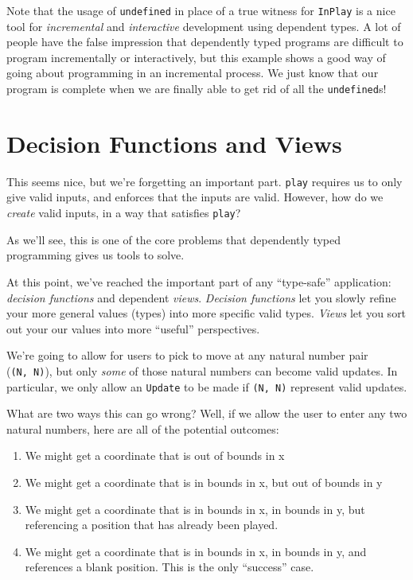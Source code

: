 \documentclass[]{article}
\begin{document}
Note that the usage of \texttt{undefined} in place of a true witness for
\texttt{InPlay} is a nice tool for \emph{incremental} and \emph{interactive}
development using dependent types. A lot of people have the false impression
that dependently typed programs are difficult to program incrementally or
interactively, but this example shows a good way of going about programming in
an incremental process. We just know that our program is complete when we are
finally able to get rid of all the \texttt{undefined}s!

\section{Decision Functions and Views}\label{decision-functions-and-views}

This seems nice, but we're forgetting an important part. \texttt{play} requires
us to only give valid inputs, and enforces that the inputs are valid. However,
how do we \emph{create} valid inputs, in a way that satisfies \texttt{play}?

As we'll see, this is one of the core problems that dependently typed
programming gives us tools to solve.

At this point, we've reached the important part of any ``type-safe''
application: \emph{decision functions} and dependent \emph{views}.
\emph{Decision functions} let you slowly refine your more general values (types)
into more specific valid types. \emph{Views} let you sort out your our values
into more ``useful'' perspectives.

We're going to allow for users to pick to move at any natural number pair
(\texttt{(N,\ N)}), but only \emph{some} of those natural numbers can become
valid updates. In particular, we only allow an \texttt{Update} to be made if
\texttt{(N,\ N)} represent valid updates.

What are two ways this can go wrong? Well, if we allow the user to enter any two
natural numbers, here are all of the potential outcomes:

\begin{enumerate}
\def\labelenumi{\arabic{enumi}.}
\tightlist
\item
  We might get a coordinate that is out of bounds in x
\item
  We might get a coordinate that is in bounds in x, but out of bounds in y
\item
  We might get a coordinate that is in bounds in x, in bounds in y, but
  referencing a position that has already been played.
\item
  We might get a coordinate that is in bounds in x, in bounds in y, and
  references a blank position. This is the only ``success'' case.
\end{enumerate}
\end{document}
